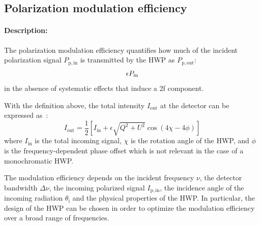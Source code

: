 
\subsection{Polarization modulation efficiency}\label{subsec:modeff}

\paragraph{Description:}
The polarization modulation efficiency quantifies how much of the incident polarization signal $P_\mathrm{p,in}$ is transmitted by the HWP as $P_\mathrm{p,out}$:
\begin{equation}
\epsilon \def \frac{P_\mathrm{out}}{P_\mathrm{in}}
\end{equation}
in the absence of systematic effects that induce a 2f component.

With the definition above, the total intensity $I_\mathrm{out}$ at the detector can be expressed as~\cite{Matsumura:2008zx}:
\begin{equation}
I_\mathrm{out}=\frac{1}{2}\left[I_\mathrm{in}+\epsilon\sqrt{Q^2+U^2} \cos(4\chi-4\phi)\right]
\end{equation}
where $I_\mathrm{in}$ is the total incoming signal, $\chi$ is the rotation angle of the HWP, and $\phi$ is the frequency-dependent phase offset which is not relevant in the case of a monochromatic HWP.

The modulation efficiency depends on the incident frequency $\nu$, the detector bandwidth $\Delta \nu$, the incoming polarized signal $I_\mathrm{p,in}$, the incidence angle of the incoming radiation $\theta_\mathrm{i}$ and the physical properties of the HWP. In particular, the design of the HWP can be chosen in order to optimize the modulation efficiency over a broad range of frequencies. 

